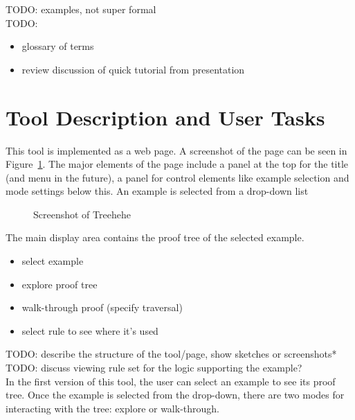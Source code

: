 \documentclass[conference]{IEEEtran}
\newcommand{\projectname}{Treehehe}
\begin{document}
TODO: examples, not super formal \\

TODO:
\begin{itemize}
\item glossary of terms
\item review discussion of quick tutorial from presentation
\end{itemize}



\section{Tool Description and User Tasks}

This tool is implemented as a web page. A screenshot of the page can be seen in Figure~\ref{fig:screenshot}. The major elements of the page include a panel at the top for the title (and menu in the future), a panel for control elements like example selection and mode settings below this. An example is selected from a drop-down list

\begin{figure}
\label{fig:screenshot}

\begin{center}
\end{center}

\caption{Screenshot of \projectname{}}
\end{figure}

The main display area contains the proof tree of the selected example.

\begin{itemize}
\item select example
\item explore proof tree
\item walk-through proof (specify traversal)
\item select rule to see where it's used
\end{itemize}

TODO: describe the structure of the tool/page, show sketches or screenshots* \\

TODO: discuss viewing rule set for the logic supporting the example? \\

In the first version of this tool, the user can select an example to see its proof tree. Once the example is selected from the drop-down, there are two modes for interacting with the tree: explore or walk-through. \\
\end{document}
